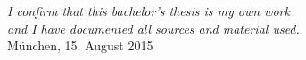 \thispagestyle{empty}

\vspace*{\fill}
\begin{flushright}
\noindent \textit{I confirm that this bachelor's thesis is my own work \\ and I have documented all sources and material used.\\[\baselineskip]}
M{\"u}nchen, 15. August 2015 \\[3.5\baselineskip]
\underline{\hspace{6.5cm}}
\end{flushright}
